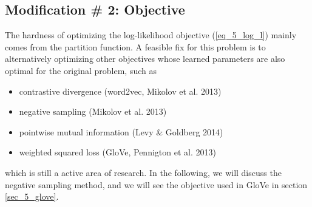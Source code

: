 \documentclass[../main.tex]{subfiles}
\begin{document}
\subsection{Modification \# 2: Objective}
The hardness of optimizing the log-likelihood objective (\ref{eq_5_log_l}) mainly comes from the partition function. A feasible fix for this problem is to alternatively optimizing other objectives whose learned parameters are also optimal for the original problem, such as
\begin{itemize}
	\item contrastive divergence (word2vec, Mikolov et al. 2013)
	\item negative sampling (Mikolov et al. 2013)
	\item pointwise mutual information (Levy \& Goldberg 2014)
	\item weighted squared loss (GloVe, Pennigton et al. 2013)
\end{itemize}
which is still a active area of research. In the following, we will discuss the negative sampling method, and we will see the objective used in GloVe in section \ref{sec_5_glove}.
\end{document}
